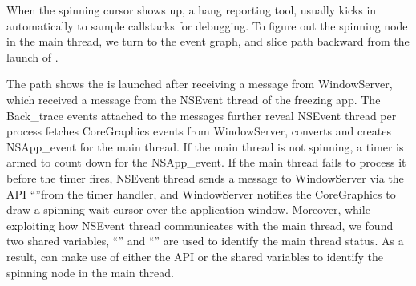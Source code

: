 When the spinning cursor shows up, a hang reporting tool, \spindump usually
kicks in automatically to sample callstacks for debugging. To figure out the
spinning node in the main thread, we turn to the event graph, and slice path
backward from the launch of \spindump.

The path shows the \spindump is launched after receiving a message from
WindowServer, which received a message from the NSEvent thread of the freezing
app. The Back\_trace events attached to the messages further reveal NSEvent
thread per process fetches CoreGraphics events from WindowServer, converts and
creates NSApp\_event for the main thread. If the main thread is not spinning,
a timer is armed to count down for the NSApp\_event. If the main thread
fails to process it before the timer fires, NSEvent thread sends a message
to WindowServer via the API ``''from the timer
handler, and WindowServer notifies the CoreGraphics to draw a spinning wait
cursor over the application window. Moreover, while exploiting how NSEvent
thread communicates with the main thread, we found two shared variables,
``'' and ``'' are used
to identify the main thread status. As a result, \xxx can make use of either the
API or the shared variables to identify the spinning node in the main thread.
